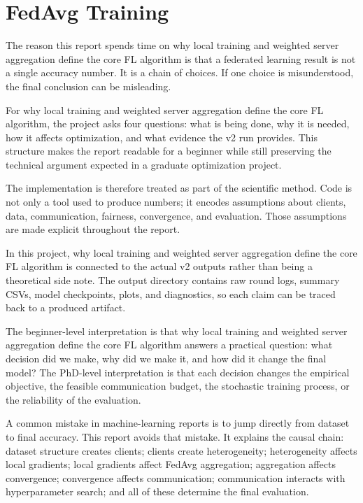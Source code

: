 \documentclass[11pt]{report}
\begin{document}
\chapter{FedAvg Training}
The reason this report spends time on why local training and weighted server aggregation define the
core FL algorithm is that a federated learning result is not a single accuracy number. It is a chain
of choices. If one choice is misunderstood, the final conclusion can be misleading.

For why local training and weighted server aggregation define the core FL algorithm, the project
asks four questions: what is being done, why it is needed, how it affects optimization, and what
evidence the v2 run provides. This structure makes the report readable for a beginner while still
preserving the technical argument expected in a graduate optimization project.

The implementation is therefore treated as part of the scientific method. Code is not only a tool
used to produce numbers; it encodes assumptions about clients, data, communication, fairness,
convergence, and evaluation. Those assumptions are made explicit throughout the report.

In this project, why local training and weighted server aggregation define the core FL algorithm is
connected to the actual v2 outputs rather than being a theoretical side note. The output directory
contains raw round logs, summary CSVs, model checkpoints, plots, and diagnostics, so each claim can
be traced back to a produced artifact.

The beginner-level interpretation is that why local training and weighted server aggregation define
the core FL algorithm answers a practical question: what decision did we make, why did we make it,
and how did it change the final model? The PhD-level interpretation is that each decision changes
the empirical objective, the feasible communication budget, the stochastic training process, or the
reliability of the evaluation.

A common mistake in machine-learning reports is to jump directly from dataset to final accuracy.
This report avoids that mistake. It explains the causal chain: dataset structure creates clients;
clients create heterogeneity; heterogeneity affects local gradients; local gradients affect FedAvg
aggregation; aggregation affects convergence; convergence affects communication; communication
interacts with hyperparameter search; and all of these determine the final evaluation.
\end{document}
